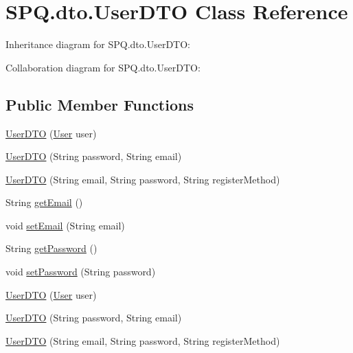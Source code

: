 \hypertarget{class_s_p_q_1_1dto_1_1_user_d_t_o}{}\section{S\+P\+Q.\+dto.\+User\+D\+TO Class Reference}
\label{class_s_p_q_1_1dto_1_1_user_d_t_o}


Inheritance diagram for S\+P\+Q.\+dto.\+User\+D\+TO\+:


Collaboration diagram for S\+P\+Q.\+dto.\+User\+D\+TO\+:
\subsection*{Public Member Functions}
\begin{DoxyCompactItemize}
\item 
\mbox{\hyperlink{class_s_p_q_1_1dto_1_1_user_d_t_o_a40cad7b1dea2117ed4cb0e69fdc6b929}{User\+D\+TO}} (\mbox{\hyperlink{class_s_p_q_1_1data_1_1_user}{User}} user)
\item 
\mbox{\hyperlink{class_s_p_q_1_1dto_1_1_user_d_t_o_a985590805ac057d894623b83b1042e29}{User\+D\+TO}} (String password, String email)
\item 
\mbox{\hyperlink{class_s_p_q_1_1dto_1_1_user_d_t_o_a97b230ddb1c2eb2cbd7ced33922fb2d2}{User\+D\+TO}} (String email, String password, String register\+Method)
\item 
String \mbox{\hyperlink{class_s_p_q_1_1dto_1_1_user_d_t_o_a67038ab8bab7cb7119ece00bcb20a360}{get\+Email}} ()
\item 
void \mbox{\hyperlink{class_s_p_q_1_1dto_1_1_user_d_t_o_a3e41397e229b7f0398232747d97d6d5e}{set\+Email}} (String email)
\item 
String \mbox{\hyperlink{class_s_p_q_1_1dto_1_1_user_d_t_o_a955f436e60336683283a6fcd6fc5f874}{get\+Password}} ()
\item 
void \mbox{\hyperlink{class_s_p_q_1_1dto_1_1_user_d_t_o_a35bd2d50e194e3d923e8adcf229e5a3e}{set\+Password}} (String password)
\item 
\mbox{\hyperlink{class_s_p_q_1_1dto_1_1_user_d_t_o_a40cad7b1dea2117ed4cb0e69fdc6b929}{User\+D\+TO}} (\mbox{\hyperlink{class_s_p_q_1_1data_1_1_user}{User}} user)
\item 
\mbox{\hyperlink{class_s_p_q_1_1dto_1_1_user_d_t_o_a985590805ac057d894623b83b1042e29}{User\+D\+TO}} (String password, String email)
\item 
\mbox{\hyperlink{class_s_p_q_1_1dto_1_1_user_d_t_o_a97b230ddb1c2eb2cbd7ced33922fb2d2}{User\+D\+TO}} (String email, String password, String register\+Method)

\end{DoxyCompactItemize}
